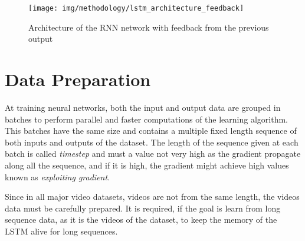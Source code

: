 \begin{figure}[H]
\begin{center}
\texttt{[image: img/methodology/lstm\_architecture\_feedback]}
\end{center}
\caption{Architecture of the RNN network with feedback from the previous output}
\label{fig:lstm_architecture_feedback}
\end{figure}





\section{Data Preparation}

At training neural networks, both the input and output data are grouped in batches to perform parallel and faster computations of the learning algorithm. This batches have the same size and contains a multiple fixed length sequence of both inputs and outputs of the dataset. The length of the sequence given at each batch is called \textit{timestep} and must a value not very high as the gradient propagate along all the sequence, and if it is high, the gradient might achieve high values known as \textit{exploiting gradient}.

Since in all major video datasets, videos are not from the same length, the videos data must be carefully prepared. It is required, if the goal is learn from long sequence data, as it is the videos of the dataset, to keep the memory of the LSTM alive for long sequences. 



